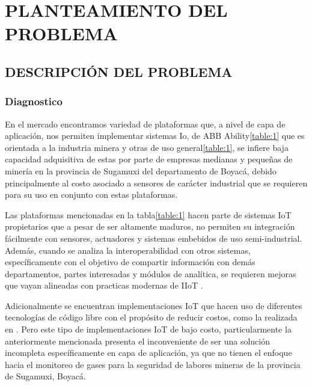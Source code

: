 \documentclass[stu,12pt,floatsintext]{apa7}
\begin{document}
	\section{PLANTEAMIENTO DEL PROBLEMA}
	\subsection{DESCRIPCIÓN DEL PROBLEMA}

	\subsubsection{Diagnostico}
	
	 En el mercado encontramos variedad de plataformas que, a nivel de capa de aplicación, nos permiten implementar sistemas Io\cite{iot-platforms}, de ABB Ability\ref{table:1} que es orientada a la industria minera y otras de uso general\ref{table:1}, se infiere baja capacidad adquisitiva de estas por parte de empresas medianas y pequeñas de minería en la provincia de Sugamuxi del departamento de Boyacá, debido principalmente al costo asociado a sensores de carácter industrial que se requieren para su uso en conjunto con estas plataformas.
	 
	Las plataformas mencionadas en la tabla\ref{table:1} hacen parte de sistemas IoT propietarios que a pesar de ser altamente maduros, no permiten su integración fácilmente con sensores, actuadores y sistemas embebidos de uso semi-industrial. Además, cuando se analiza la interoperabilidad con otros sistemas, específicamente con el objetivo de compartir información con demás departamentos, partes interesadas y módulos de analítica, se requieren mejoras que vayan alineadas con practicas modernas de IIoT \cite{iot1020029}.
	
	Adicionalmente se encuentran implementaciones IoT  que hacen uso de diferentes tecnologías de código libre con el propósito de reducir costos, como la realizada en  \cite{electronics8080822}. Pero este tipo de implementaciones IoT  de bajo costo, particularmente la anteriormente mencionada presenta el inconveniente de ser una solución incompleta específicamente en capa de aplicación, ya que no tienen el enfoque hacia el monitoreo de gases para la seguridad de labores mineras de la provincia de Sugamuxi, Boyacá.
	 
\end{document}
